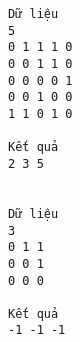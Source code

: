 \begin{verbatim}
Dữ liệu
5
0 1 1 1 0
0 0 1 1 0
0 0 0 0 1
0 0 1 0 0
1 1 0 1 0

Kết quả
2 3 5


Dữ liệu
3
0 1 1
0 0 1
0 0 0

Kết quả
-1 -1 -1
\end{verbatim}